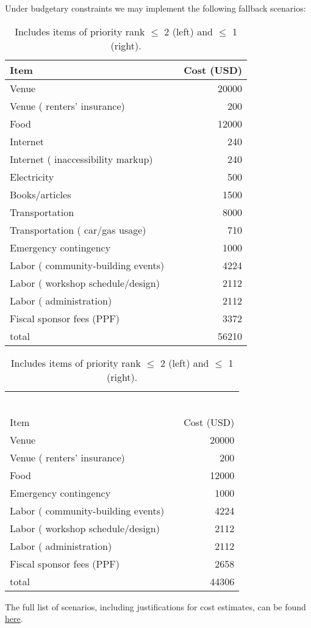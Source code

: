 \documentclass[10pt]{article}
\begin{document}
Under budgetary constraints we may implement the following fallback scenarios:

\begin{table}[h]
\begin{tabular}{llr}
Item &  & Cost (USD) \\ \hline
Venue &  & 20000 \\
Venue ( renters' insurance) &  & 200 \\
Food &  & 12000 \\
Internet &  & 240 \\
Internet ( inaccessibility markup) &  & 240 \\
Electricity &  & 500 \\
Books/articles &  & 1500 \\
Transportation &  & 8000 \\
Transportation ( car/gas usage) &  & 710 \\
Emergency contingency &  & 1000 \\
Labor ( community-building events) &  & 4224 \\
Labor ( workshop schedule/design) &  & 2112 \\
Labor ( administration) &  & 2112 \\
Fiscal sponsor fees (PPF) &  & 3372 \\ \hline
total &  & 56210
\end{tabular}
\begin{tabular}{llr}
 & & \\
 & & \\
 & & \\
 & & \\
 & & \\
 & & \\
Item &  & Cost (USD) \\ \hline
Venue &  & 20000 \\
Venue ( renters' insurance) &  & 200 \\
Food &  & 12000 \\
Emergency contingency &  & 1000 \\
Labor ( community-building events) &  & 4224 \\
Labor ( workshop schedule/design) &  & 2112 \\
Labor ( administration) &  & 2112 \\
Fiscal sponsor fees (PPF) &  & 2658 \\ \hline
total &  & 44306
\end{tabular}
\caption{Includes items of priority rank $\leq$ 2 (left) and $\leq$ 1 (right).}\label{caplab}
\end{table}

The full list of scenarios, including justifications for cost estimates, can be found \href{https://raw.githubusercontent.com/let-me-think/let-me-think.github.io/master/budget_2023/budget_projection.pdf}{here}.
\end{document}
